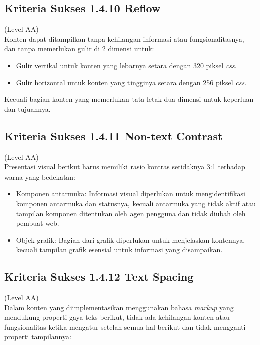 \subsection{Kriteria Sukses 1.4.10 Reflow}
\label{subsec:kriteria_1.4.10}
(Level AA) \\

Konten dapat ditampilkan tanpa kehilangan informasi atau fungsionalitasnya, dan tanpa memerlukan gulir di 2 dimensi untuk:

\begin{itemize}
	\item Gulir vertikal untuk konten yang lebarnya setara dengan 320 piksel \textit{css}.
	\item Gulir horizontal untuk konten yang tingginya setara dengan 256 piksel \textit{css}.
\end{itemize}

Kecuali bagian konten yang memerlukan tata letak dua dimensi untuk keperluan dan tujuannya.

\subsection{Kriteria Sukses 1.4.11 Non-text Contrast}
\label{subsec:kriteria_1.4.11}
(Level AA) \\

Presentasi visual berikut harus memiliki rasio kontras setidaknya 3:1 terhadap warna yang bedekatan:

\begin{itemize}
	\item Komponen antarmuka: Informasi visual diperlukan untuk mengidentifikasi komponen antarmuka dan statusnya, kecuali antarmuka yang tidak aktif atau tampilan komponen ditentukan oleh agen pengguna dan tidak diubah oleh pembuat web.
	\item Objek grafik: Bagian dari grafik diperlukan untuk menjelaskan kontennya, kecuali tampilan grafik esensial untuk informasi yang disampaikan.
\end{itemize}

\subsection{Kriteria Sukses 1.4.12 Text Spacing}
\label{subsec:kriteria_1.4.12}
(Level AA) \\

Dalam konten yang diimplementasikan menggunakan bahasa \textit{markup} yang mendukung properti gaya teks berikut, tidak ada kehilangan konten atau fungsionalitas ketika mengatur setelan semua hal berikut dan tidak mengganti properti tampilannya: 

